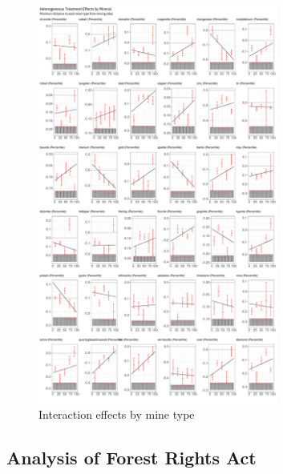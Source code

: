 \documentclass[12pt,reqno]{article}
\begin{document}
\begin{refsection}
\begin{figure}[htbp!]
  \centering
  \includegraphics[width = 0.7\textwidth]{Output/mining_het_te.pdf}
  \caption{Interaction effects by mine type}
  \label{fig:mine_het_te}
\end{figure}




\pagebreak

\subsection{Analysis of Forest Rights Act}



\end{refsection}
\end{document}
